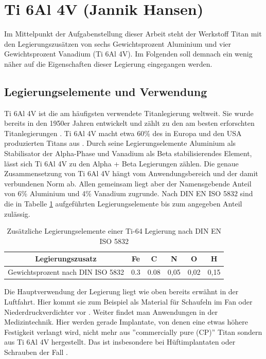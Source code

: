 \documentclass[a4paper, 11pt]{tubsreprt}
\begin{document}
\section{Ti 6Al 4V (Jannik Hansen)}\label{Kapitel ti64}
Im Mittelpunkt der Aufgabenstellung dieser Arbeit steht der Werkstoff Titan mit den Legierungszusätzen von sechs Gewichtsprozent Aluminium und vier Gewichtsprozent Vanadium (Ti 6Al 4V). Im Folgenden soll demnach ein wenig näher auf die Eigenschaften dieser Legierung eingegangen werden.  
\subsection{Legierungselemente und Verwendung}
Ti 6Al 4V ist die am häufigsten verwendete Titanlegierung weltweit. Sie wurde bereits in den 1950er Jahren entwickelt und zählt zu den am besten erforschten Titanlegierungen \cite{Leyens2002}. Ti 6Al 4V macht etwa 60\% des in Europa und den USA produzierten Titans aus \cite{Sieniawski2013}. Durch seine Legierungselemente Aluminium als Stabilisator der Alpha-Phase und Vanadium als Beta stabilisierendes Element, lässt sich Ti 6Al 4V zu den Alpha + Beta Legierungen zählen. Die genaue Zusammensetzung von Ti 6Al 4V hängt vom Anwendungsbereich und der damit verbundenen Norm ab. Allen gemeinsam liegt aber der Namensgebende Anteil von 6\% Aluminium und 4\% Vanadium zugrunde. Nach DIN EN ISO 5832 sind die in Tabelle \ref{Tabelle Norm Legierungselemente Ti64} aufgeführten Legierungselemente bis zum angegeben Anteil zulässig.

\begin{table}[t]
\begin{tabular}{c|c|c|c|c|c}
Legierungszusatz & Fe & C & N & O & H \\
\hline
Gewichtsprozent nach DIN ISO 5832 & 0.3 & 0.08 & 0,05 & 0,02 & 0,15 \\
\end{tabular}
\caption{Zusätzliche Legierungselemente einer Ti-64 Legierung nach DIN EN ISO 5832}
\label{Tabelle Norm Legierungselemente Ti64}
\end{table}

Die Hauptverwendung der Legierung liegt wie oben bereits erwähnt in der Luftfahrt. Hier kommt sie zum Beispiel als Material für Schaufeln im Fan oder Niederdruckverdichter vor \cite{Luetjering2007}. Weiter findet man Anwendungen in der Medizintechnik. Hier werden gerade Implantate, von denen eine etwas höhere Festigkeit verlangt wird, nicht mehr aus ''commercially pure (CP)'' Titan sondern aus Ti 6Al 4V hergestellt. Das ist insbesondere bei Hüftimplantaten oder Schrauben der Fall \cite{Luetjering2007}.
\end{document}
